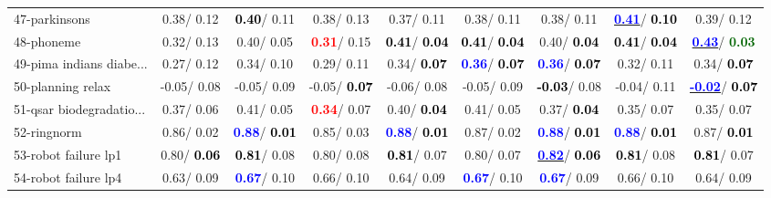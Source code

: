 \begin{table}[h]
\begin{center}
\begin{tabular}{lc|c|c|c|c|c|c|c}
47-parkinsons &   0.38/  0.12 & \textcolor{black}{\textbf{  0.40}}/  0.11 &   0.38/  0.13 &   0.37/  0.11 &   0.38/  0.11 &   0.38/  0.11 & \underline{\textcolor{blue}{\textbf{  0.41}}}/\textcolor{black}{\textbf{  0.10}} &   0.39/  0.12 \\
48-phoneme &   0.32/  0.13 &   0.40/  0.05 & \textcolor{red}{\textbf{  0.31}}/  0.15 & \textcolor{black}{\textbf{  0.41}}/\textcolor{black}{\textbf{  0.04}} & \textcolor{black}{\textbf{  0.41}}/\textcolor{black}{\textbf{  0.04}} &   0.40/\textcolor{black}{\textbf{  0.04}} & \textcolor{black}{\textbf{  0.41}}/\textcolor{black}{\textbf{  0.04}} & \underline{\textcolor{blue}{\textbf{  0.43}}}/\textcolor{darkgreen}{\textbf{  0.03}} \\
49-pima indians diabe... &   0.27/  0.12 &   0.34/  0.10 &   0.29/  0.11 &   0.34/\textcolor{black}{\textbf{  0.07}} & \textcolor{blue}{\textbf{  0.36}}/\textcolor{black}{\textbf{  0.07}} & \textcolor{blue}{\textbf{  0.36}}/\textcolor{black}{\textbf{  0.07}} &   0.32/  0.11 &   0.34/\textcolor{black}{\textbf{  0.07}} \\
50-planning relax &  -0.05/  0.08 &  -0.05/  0.09 &  -0.05/\textcolor{black}{\textbf{  0.07}} &  -0.06/  0.08 &  -0.05/  0.09 & \textcolor{black}{\textbf{ -0.03}}/  0.08 &  -0.04/  0.11 & \underline{\textcolor{blue}{\textbf{ -0.02}}}/\textcolor{black}{\textbf{  0.07}} \\
51-qsar biodegradatio... &   0.37/  0.06 &   0.41/  0.05 & \textcolor{red}{\textbf{  0.34}}/  0.07 &   0.40/\textcolor{black}{\textbf{  0.04}} &   0.41/  0.05 &   0.37/\textcolor{black}{\textbf{  0.04}} &   0.35/  0.07 &   0.35/  0.07 \\
52-ringnorm &   0.86/  0.02 & \textcolor{blue}{\textbf{  0.88}}/\textcolor{black}{\textbf{  0.01}} &   0.85/  0.03 & \textcolor{blue}{\textbf{  0.88}}/\textcolor{black}{\textbf{  0.01}} &   0.87/  0.02 & \textcolor{blue}{\textbf{  0.88}}/\textcolor{black}{\textbf{  0.01}} & \textcolor{blue}{\textbf{  0.88}}/\textcolor{black}{\textbf{  0.01}} &   0.87/\textcolor{black}{\textbf{  0.01}} \\
53-robot failure lp1 &   0.80/\textcolor{black}{\textbf{  0.06}} & \textcolor{black}{\textbf{  0.81}}/  0.08 &   0.80/  0.08 & \textcolor{black}{\textbf{  0.81}}/  0.07 &   0.80/  0.07 & \underline{\textcolor{blue}{\textbf{  0.82}}}/\textcolor{black}{\textbf{  0.06}} & \textcolor{black}{\textbf{  0.81}}/  0.08 & \textcolor{black}{\textbf{  0.81}}/  0.07 \\ \hline
54-robot failure lp4 &   0.63/  0.09 & \textcolor{blue}{\textbf{  0.67}}/  0.10 &   0.66/  0.10 &   0.64/  0.09 & \textcolor{blue}{\textbf{  0.67}}/  0.10 & \textcolor{blue}{\textbf{  0.67}}/  0.09 &   0.66/  0.10 &   0.64/  0.09 \\

\end{tabular}
\end{center}
\end{table}
